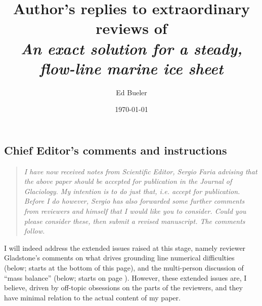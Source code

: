 \documentclass[11pt,reqno]{amsart}
\title[Author's replies to extraordinary reviews of \emph{An exact solution \dots}]{Author's replies to extraordinary reviews of \\ \emph{An exact solution for a steady, flow-line marine ice sheet}}
\author{Ed Bueler}
\date{\today}
\begin{document}
\maketitle

\thispagestyle{empty}



\subsection*{Chief Editor's comments and instructions}  \begin{quote}
\emph{I have now received notes from Scientific Editor, Sergio Faria advising that the above paper should be accepted for publication in the Journal of Glaciology.  My intention is to do just that, i.e. accept for publication.  Before I do however, Sergio has also forwarded some further comments from reviewers and himself that I would like you to consider.  Could you please consider these, then submit a revised manuscript.  The comments follow.}
\end{quote}

\medskip
\noindent I will indeed address the extended issues raised at this stage, namely reviewer Gladstone's comments on what drives grounding line numerical difficulties (below; starts at the bottom of this page), and the multi-person discussion of ``mass balance'' (below; starts on page \pageref{mb}).  However, these extended issues are, I believe, driven by off-topic obsessions on the parts of the reviewers, and they have minimal relation to the actual content of my paper.
\end{document}
